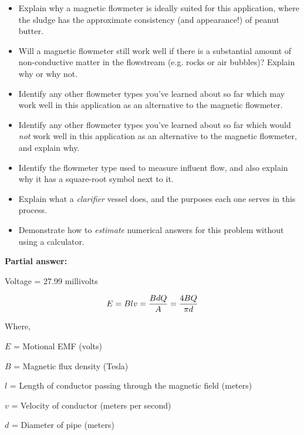 \begin{itemize}
\item{} Explain why a magnetic flowmeter is ideally suited for this application, where the sludge has the approximate consistency (and appearance!) of peanut butter.
\item{} Will a magnetic flowmeter still work well if there is a substantial amount of non-conductive matter in the flowstream (e.g. rocks or air bubbles)?  Explain why or why not.
\item{} Identify any other flowmeter types you've learned about so far which may work well in this application as an alternative to the magnetic flowmeter.
\item{} Identify any other flowmeter types you've learned about so far which would {\it not} work well in this application as an alternative to the magnetic flowmeter, and explain why.
\item{} Identify the flowmeter type used to measure influent flow, and also explain why it has a square-root symbol next to it.
\item{} Explain what a {\it clarifier} vessel does, and the purposes each one serves in this process.
\item{} Demonstrate how to {\it estimate} numerical answers for this problem without using a calculator.
\end{itemize}







\noindent
{\bf Partial answer:}

\vskip 10pt

Voltage = 27.99 millivolts







$$E = Blv = {B d Q \over A} = {4 B Q \over \pi d}$$

\noindent
Where,

$E$ = Motional EMF (volts)

$B$ = Magnetic flux density (Tesla)

$l$ = Length of conductor passing through the magnetic field (meters)

$v$ = Velocity of conductor (meters per second)

$d$ = Diameter of pipe (meters)

